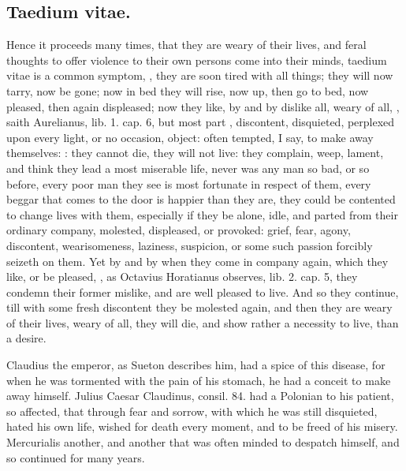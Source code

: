 {\subsection{Taedium vitae.}
Hence it proceeds many times, that they are weary of
their lives, and feral thoughts to offer violence to their own persons
come into their minds, taedium vitae is a common symptom, , they are soon tired with all things; they will now
tarry, now be gone; now in bed they will rise, now up, then go to bed,
now pleased, then again displeased; now they like, by and by dislike
all, weary of all, , saith
Aurelianus, lib. 1. cap. 6, but most part ,
discontent, disquieted, perplexed upon every light, or no occasion,
object: often tempted, I say, to make away themselves: : they cannot die, they will not live: they
complain, weep, lament, and think they lead a most miserable life,
never was any man so bad, or so before, every poor man they see is most
fortunate in respect of them, every beggar that comes to the door is
happier than they are, they could be contented to change lives with
them, especially if they be alone, idle, and parted from their ordinary
company, molested, displeased, or provoked: grief, fear, agony,
discontent, wearisomeness, laziness, suspicion, or some such passion
forcibly seizeth on them. Yet by and by when they come in company
again, which they like, or be pleased, , as Octavius Horatianus observes, lib. 2.
cap. 5, they condemn their former mislike, and are well pleased to
live. And so they continue, till with some fresh discontent they be
molested again, and then they are weary of their lives, weary of all,
they will die, and show rather a necessity to live, than a desire.

Claudius the emperor, as Sueton describes him, had a spice of
this disease, for when he was tormented with the pain of his stomach,
he had a conceit to make away himself. Julius Caesar Claudinus, consil.
84. had a Polonian to his patient, so affected, that through fear
and sorrow, with which he was still disquieted, hated his own life,
wished for death every moment, and to be freed of his misery.
Mercurialis another, and another that was often minded to despatch
himself, and so continued for many years.

}
